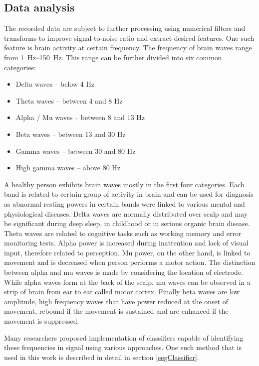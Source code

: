\subsection{Data analysis}
\label{sub:dataAnalysis}
The recorded data are subject to further processing using numerical filters and
transforms to improve signal-to-noise ratio and extract desired features. 
One such feature is brain activity at certain frequency. The frequency of brain
waves range from \SIrange{1}{150}{\Hz}. This range can be further divided
into six common categories\cite{dominantF}:
\begin{itemize}
  \item Delta waves -- below 4 Hz
  \item Theta waves -- between 4 and 8 Hz
  \item Alpha / Mu waves -- between 8 and 13 Hz
  \item Beta waves -- between 13 and 30 Hz
  \item Gamma waves -- between 30 and 80 Hz
  \item High gamma waves -- above 80 Hz
\end{itemize}
A healthy person exhibits brain waves mostly in the first four categories. Each
band is related to certain group of activity in brain and can be used for
diagnosis as abnormal resting powers in certain bands were linked to various
mental and physiological diseases. \cite{dominantF} Delta waves are normally
distributed over scalp and may be significant during deep sleep, in childhood or
in serious organic brain disease. \cite{eegClass} Theta waves are related to
cognitive tasks such as working memory and error monitoring tests. Alpha power
is increased during inattention and lack of visual input, therefore related to
perception. Mu power, on the other hand, is linked to movement and is decreased
when person performs a motor action. The distinction between alpha and mu waves
is made by considering the location of electrode. While alpha waves form at the
back of the scalp, mu waves can be observed in a strip of brain from ear to ear
called motor cortex. Finally beta waves are low amplitude, high frequency waves
that have power reduced at the onset of movement, rebound if the movement is
sustained and are enhanced if the movement is suppressed. \cite{dominantF}

Many researchers proposed implementation of classifiers capable of identifying
these frequencies in signal using various approaches. One such method that is
used in this work is described in detail in section \ref{eegClassifier}.

